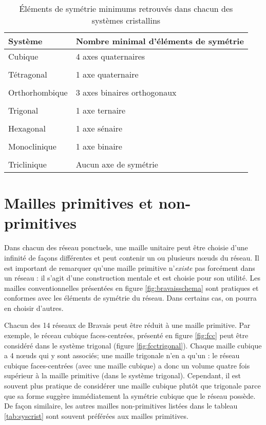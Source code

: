 \begin{table}
    \begin{tabularx}{\textwidth}{lX}
        \toprule
        Système & Nombre minimal d'éléments de symétrie \\
        \midrule
        Cubique & 4 axes quaternaires \\
        & \\
        Tétragonal & 1 axe quaternaire \\
        & \\
        Orthorhombique & 3 axes binaires orthogonaux \\
        & \\
        Trigonal & 1 axe ternaire \\
        & \\
        Hexagonal & 1 axe sénaire \\
        & \\
        Monoclinique & 1 axe binaire \\
        & \\
        Triclinique & Aucun axe de symétrie\\
        \bottomrule
    \end{tabularx}
    \label{tab:minsym}
    \caption{Éléments de symétrie minimums retrouvés dans chacun des systèmes
    cristallins}
\end{table}

\section{Mailles primitives et non-primitives}

Dans chacun des réseau ponctuels, une maille unitaire peut être choisie d'une
infinité de façons différentes et peut contenir un ou plusieurs nœuds du réseau.
Il est important de remarquer qu'une maille primitive n'\emph{existe} pas
forcément dans un réseau : il s'agit d'une construction mentale et est choisie
pour son utilité. Les mailles conventionnelles présentées en figure
\ref{fig:bravaisschema} sont pratiques et conformes avec les éléments de symétrie
du réseau. Dans certains cas, on pourra en choisir d'autres.

Chacun des 14 réseaux de Bravais peut être réduit à une maille primitive. Par
exemple, le réceau cubique faces-centrées, présenté en figure \ref{fig:fcc} peut
être considéré dans le système trigonal (figure \ref{fig:fcctrigonal}). Chaque
maille cubique a 4 nœuds qui y sont associés; une maille trigonale n'en a qu'un :
le réseau cubique faces-centrées (avec une maille cubique) a donc un
volume quatre fois supérieur à la maille primitive (dans le système trigonal).
Cependant, il est souvent plus pratique de considérer une maille cubique plutôt
que trigonale parce que sa forme suggère immédiatement la symétrie cubique que le
réseau possède. De façon similaire, les autres mailles non-primitives listées
dans le tableau \ref{tab:syscrist} sont souvent préférées aux mailles primitives.

